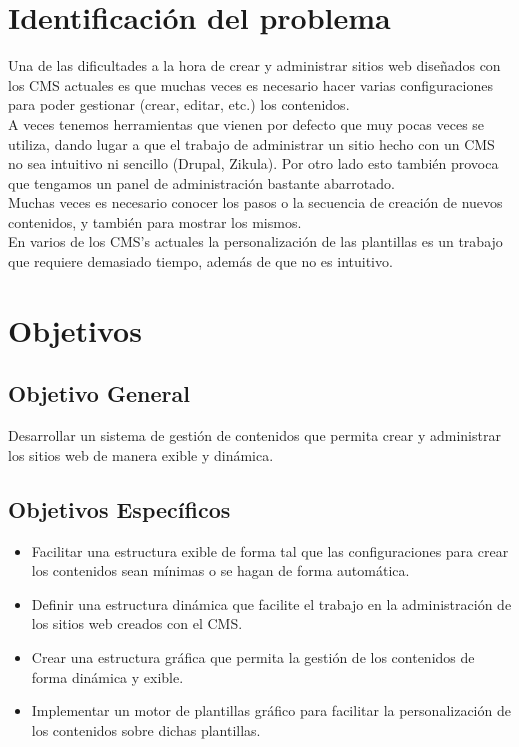 \section{Identificaci\'on del problema}
Una de las dificultades a la hora de crear y administrar sitios web dise\~nados con los CMS actuales es que muchas veces es necesario hacer varias configuraciones para poder gestionar (crear, editar, etc.) los contenidos.\\
A veces tenemos herramientas que vienen por defecto que muy pocas veces se utiliza, dando lugar a que el trabajo de administrar un sitio hecho con un CMS no sea intuitivo ni sencillo (Drupal, Zikula). Por otro lado esto tambi\'en provoca que tengamos un panel de administraci\'on bastante abarrotado.\\
Muchas veces es necesario conocer los pasos o la secuencia de creaci\'on de nuevos contenidos, y tambi\'en para mostrar los mismos.\\
En varios de los CMS's actuales la personalizaci\'on de las plantillas es un trabajo que requiere demasiado tiempo, adem\'as de que no es intuitivo.\\

\section{Objetivos}
\subsection{Objetivo General}
Desarrollar un sistema de gesti\'on de contenidos que permita crear y administrar los sitios web de manera exible y din\'amica.

\subsection{Objetivos Espec\'ificos}
\begin{itemize}
  \item Facilitar una estructura exible de forma tal que las configuraciones para crear los contenidos sean m\'inimas o se hagan de forma autom\'atica.
  \item Definir una estructura din\'amica que facilite el trabajo en la administraci\'on de los sitios web creados con el CMS.
  \item Crear una estructura gr\'afica que permita la gesti\'on de los contenidos de forma din\'amica y exible.
  \item Implementar un motor de plantillas gr\'afico para facilitar la personalizaci\'on de los contenidos sobre dichas plantillas.
\end{itemize}

